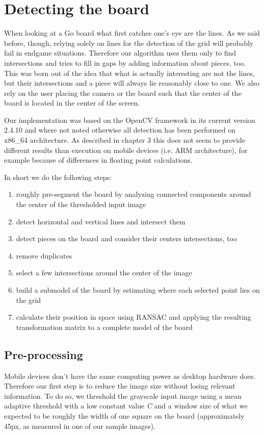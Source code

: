 
\chapter{Detecting the board}
	\label{detector}
	When looking at a Go board what first catches one's eye are the lines. As we said before, though, relying solely on lines for the detection of the grid will probably fail in endgame situations. Therefore our algorithm uses them only to find intersections and tries to fill in gaps by adding information about pieces, too. This was born out of the idea that what is actually interesting are not the lines, but their intersections and a piece will always lie reasonably close to one. We also rely on the user placing the camera or the board such that the center of the board is located in the center of the screen.

	Our implementation was based on the OpenCV framework in its current version 2.4.10 and where not noted otherwise all detection has been performed on x86\_64 architecture. As described in chapter 3 this does not seem to provide different results than execution on mobile devices (i.e. ARM architecture), for example because of differences in floating point calculations.

	In short we do the following steps:
	\begin{enumerate}
		\item roughly pre-segment the board by analyzing connected components around the center of the thresholded input image
		\item detect horizontal and vertical lines and intersect them
		\item detect pieces on the board and consider their centers intersections, too
		\item remove duplicates
		\item select a few intersections around the center of the image
		\item build a submodel of the board by estimating where each selected point lies on the grid
		\item calculate their position in space using RANSAC and applying the resulting transformation matrix to a complete model of the board
	\end{enumerate}

	\section{Pre-processing}
	\label{detector-preprocessing}
	Mobile devices don't have the same computing power as desktop hardware does. Therefore our first step is to reduce the image size without losing relevant information. To do so, we threshold the grayscale input image using a mean adaptive threshold with a low constant value \emph{C} and a window size of what we expected to be roughly the width of one square on the board (approximately 45px, as measured in one of our sample images).

